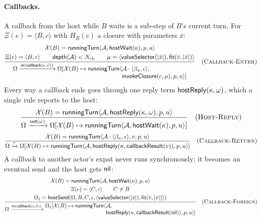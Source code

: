 \paragraph{Callbacks.}
A callback from the host while $B$ waits is a sub-step of $B$'s current turn.
For $\Xi(e)=\langle B,c\rangle$ with $H_B(c)$ a closure with parameters
$\bar x$:
\[
\dfrac{\begin{gathered}
 \mathcal X(B)=\mathsf{runningTurn}\langle\mathcal A,\mathsf{hostWait}(\kappa),p,u\rangle\\
 \Xi(e)=\langle B,c\rangle\qquad \mathsf{depth}(\mathcal A)<N_{\mathrm{cb}}\qquad
 \mu=\langle\mathsf{valueSelector}(|\bar x|),\mathsf{fit}(\bar v,|\bar x|)\rangle
 \end{gathered}}
 {\begin{aligned}
  \Omega\xrightarrow{\mathsf{in}(\mathsf{callback}(e,\bar v))}
  \Omega[\mathcal X(B)\mapsto\mathsf{runningTurn}\langle
     &\mathcal A\cdot\langle\beta_\kappa,\epsilon\rangle,\\[-1mm]
     &\mathsf{invokeClosure}(c,\mu),p,u\rangle]
 \end{aligned}}
\quad(\textsc{Callback-Enter})
\]
Every way a callback ends goes through one reply term
$\mathsf{hostReply}(\kappa,\omega)$, which a single rule reports to the host:
\[
\dfrac{\mathcal X(B)=\mathsf{runningTurn}\langle\mathcal A,\mathsf{hostReply}(\kappa,\omega),p,u\rangle}
 {\Omega\xrightarrow{\mathsf{out}(\omega)}
  \Omega[\mathcal X(B)\mapsto\mathsf{runningTurn}\langle
     \mathcal A,\mathsf{hostWait}(\kappa),p,u\rangle]}
\quad(\textsc{Host-Reply})
\]
\[
\dfrac{\mathcal X(B)=\mathsf{runningTurn}\langle
   \mathcal A\cdot\langle\beta_\kappa,\epsilon\rangle,v,p,u\rangle}
 {\Omega\xrightarrow{\tau}
  \Omega[\mathcal X(B)\mapsto\mathsf{runningTurn}\langle
     \mathcal A,\mathsf{hostReply}(\kappa,\mathsf{callbackResult}(v)),p,u\rangle]}
\quad(\textsc{Callback-Return})
\]
A callback to another actor's expat never runs synchronously; it becomes an
eventual send and the host gets $\mathsf{nil}$:
\[
\dfrac{\begin{gathered}
 \mathcal X(B)=\mathsf{runningTurn}\langle\mathcal A,\mathsf{hostWait}(\kappa),p,u\rangle\\
 \Xi(e)=\langle C,c\rangle\qquad C\ne B\\
 \Omega_1=\mathsf{hostSend}(\Omega,B,C,c,
   \langle\mathsf{valueSelector}(|\bar x|),\mathsf{fit}(\bar v,|\bar x|)\rangle)
 \end{gathered}}
 {\Omega\xrightarrow{\mathsf{in}(\mathsf{callback}(e,\bar v))}
  \begin{aligned}\Omega_1[\mathcal X(B)\mapsto\mathsf{runningTurn}\langle
     &\mathcal A,\\[-1mm]
     &\mathsf{hostReply}(\kappa,\mathsf{callbackResult}(\mathsf{nil})),p,u\rangle]
  \end{aligned}}
\quad(\textsc{Callback-Foreign})
\]
